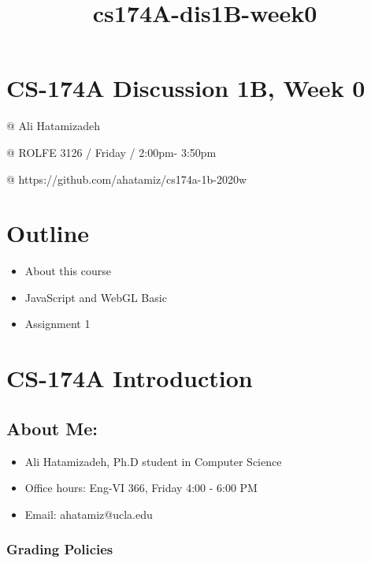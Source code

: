 \documentclass[11pt]{article}
\title{cs174A-dis1B-week0}
\providecommand{\tightlist}{%
      \setlength{\itemsep}{0pt}\setlength{\parskip}{0pt}}
\begin{document}
    
    
    \maketitle
    
    

    
    \section{CS-174A Discussion 1B, Week
0}\label{cs-174a-discussion-1b-week-0}

@ Ali Hatamizadeh

@ ROLFE 3126 / Friday / 2:00pm- 3:50pm

@ https://github.com/ahatamiz/cs174a-1b-2020w

    \section{Outline}\label{outline}

\begin{itemize}
\tightlist
\item
  About this course
\item
  JavaScript and WebGL Basic
\item
  Assignment 1
\end{itemize}

    \section{CS-174A Introduction}\label{cs-174a-introduction}

\subsection{About Me:}\label{about-me}

\begin{itemize}
\item
  Ali Hatamizadeh, Ph.D student in Computer Science
\item
  Office hours: Eng-VI 366, Friday 4:00 - 6:00 PM
\item
  Email: ahatamiz@ucla.edu
\end{itemize}

    \subsubsection{Grading Policies}\label{grading-policies}
\end{document}
